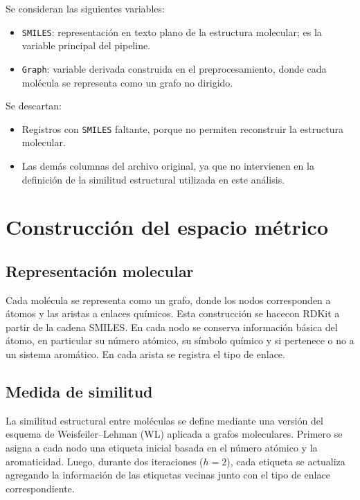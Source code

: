 \documentclass[12pt]{article}
\begin{document}
Se consideran las siguientes variables:
\begin{itemize}
    \item \texttt{SMILES}: representaci\'on en texto plano de la estructura molecular; es la variable principal del pipeline.
    \item \texttt{Graph}: variable derivada construida en el preprocesamiento, donde cada mol\'ecula se representa como un grafo no dirigido.
\end{itemize}

Se descartan:
\begin{itemize}
    \item Registros con \texttt{SMILES} faltante, porque no permiten reconstruir la estructura molecular.
    \item Las dem\'as columnas del archivo original, ya que no intervienen en la definici\'on de la similitud estructural utilizada en este an\'alisis.
\end{itemize}

\section{Construcci\'on del espacio m\'etrico}

\subsection{Representaci\'on molecular}

Cada mol\'ecula se representa como un grafo, donde los nodos corresponden a \'atomos y las aristas a enlaces qu\'imicos. Esta construcci\'on se hacecon RDKit a partir de la cadena SMILES. En cada nodo se conserva informaci\'on b\'asica del \'atomo, en particular su n\'umero at\'omico, su s\'imbolo qu\'imico y si pertenece o no a un sistema arom\'atico. En cada arista se registra el tipo de enlace.

\subsection{Medida de similitud}

La similitud estructural entre mol\'eculas se define mediante una versi\'on del esquema de Weisfeiler--Lehman (WL) aplicada a grafos moleculares. Primero se asigna a cada nodo una etiqueta inicial basada en el n\'umero at\'omico y la aromaticidad. Luego, durante dos iteraciones ($h=2$), cada etiqueta se actualiza agregando la informaci\'on de las etiquetas vecinas junto con el tipo de enlace correspondiente.
\end{document}
